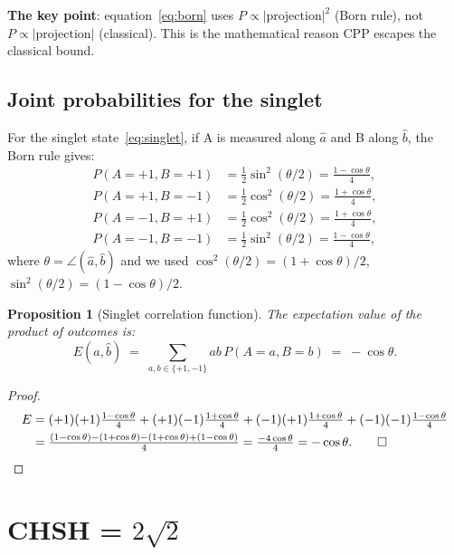 \documentclass[11pt,a4paper]{article}
\newtheorem{proposition}[theorem]{Proposition}
\begin{document}
\textbf{The key point}: equation~\eqref{eq:born} uses
$P \propto |\text{projection}|^2$ (Born rule), not
$P \propto |\text{projection}|$ (classical).
This is the mathematical reason CPP escapes the classical bound.

\subsection{Joint probabilities for the singlet}

For the singlet state~\eqref{eq:singlet}, if A is measured along
$\hat{a}$ and B along $\hat{b}$, the Born rule gives:
\begin{align}
P(A{=}+1, B{=}+1) &= \tfrac{1}{2}\sin^2(\theta/2)
  = \tfrac{1-\cos\theta}{4}, \label{eq:ppp}\\
P(A{=}+1, B{=}-1) &= \tfrac{1}{2}\cos^2(\theta/2)
  = \tfrac{1+\cos\theta}{4}, \label{eq:ppm}\\
P(A{=}-1, B{=}+1) &= \tfrac{1}{2}\cos^2(\theta/2)
  = \tfrac{1+\cos\theta}{4}, \label{eq:pmp}\\
P(A{=}-1, B{=}-1) &= \tfrac{1}{2}\sin^2(\theta/2)
  = \tfrac{1-\cos\theta}{4}, \label{eq:pmm}
\end{align}
where $\theta = \angle(\hat{a},\hat{b})$ and we used
$\cos^2(\theta/2) = (1+\cos\theta)/2$, $\sin^2(\theta/2) = (1-\cos\theta)/2$.

\begin{proposition}[Singlet correlation function]
\label{prop:corr}
The expectation value of the product of outcomes is:
\begin{equation}
E(\hat{a},\hat{b}) \;=\; \sum_{a,b \in \{+1,-1\}} ab\,P(A{=}a,B{=}b)
\;=\; -\cos\theta.
\label{eq:corr}
\end{equation}
\end{proposition}

\begin{proof}
\begin{align}
E &= (+1)(+1)\tfrac{1-\cos\theta}{4}
   + (+1)(-1)\tfrac{1+\cos\theta}{4}
   + (-1)(+1)\tfrac{1+\cos\theta}{4}
   + (-1)(-1)\tfrac{1-\cos\theta}{4} \notag\\
  &= \tfrac{(1-\cos\theta) - (1+\cos\theta) - (1+\cos\theta) + (1-\cos\theta)}{4}
  = \tfrac{-4\cos\theta}{4}
  = -\cos\theta. \qed
\end{align}
\end{proof}

\section{CHSH = $2\sqrt{2}$}
\label{sec:chsh}
\end{document}
